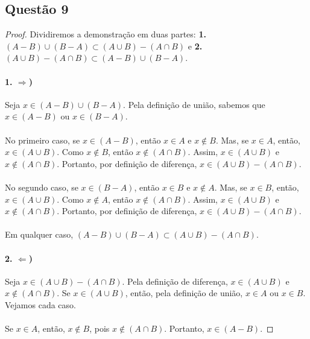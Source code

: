 \documentclass[11pt,a4paper]{report}
\begin{document}
    \subsection{Questão 9}
    \begin{proof}
    Dividiremos a demonstração em duas partes: \textbf{1.} $(A - B) \cup (B - A) \subset (A \cup B) - (A \cap B)$ e \textbf{2.} $(A \cup B) - (A \cap B) \subset (A - B) \cup (B - A)$.

    \paragraph{1. $\Rightarrow$)}
    Seja $x \in (A - B) \cup (B - A)$. Pela definição de união, sabemos que $x \in (A - B)$ ou $x \in (B - A)$. 
    
    \paragraph{}
    No primeiro caso, se $x \in (A - B)$, então $x \in A$ e $x \not\in B$. Mas, se $x \in A$, então, $x \in (A \cup B)$. Como $x \not\in B$, então $x \not\in (A \cap B)$. Assim, $x \in (A \cup B)$ e $x \not\in (A \cap B)$. Portanto, por definição de diferença, $x \in (A \cup B) - (A \cap B)$.

    \paragraph{}
    No segundo caso, se $x \in (B - A)$, então $x \in B$ e $x \not\in A$. Mas, se $x \in B$, então, $x \in (A \cup B)$. Como $x \not\in A$, então $x \not\in (A \cap B)$. Assim, $x \in (A \cup B)$ e $x \not\in (A \cap B)$. Portanto, por definição de diferença, $x \in (A \cup B) - (A \cap B)$.

    \paragraph{}
    Em qualquer caso, $(A - B) \cup (B - A) \subset (A \cup B) - (A \cap B)$.

    \paragraph{2. $\Leftarrow$)}
    Seja $x \in (A \cup B) - (A \cap B)$. Pela definição de diferença, $x \in (A \cup B)$ e $x \not\in (A \cap B)$. Se $x \in (A \cup B)$, então, pela definição de união, $x \in A $ ou $x \in B$. Vejamos cada caso.

    \paragraph{}
    Se $x \in A$, então, $x \not\in B$, pois $x \not\in (A \cap B)$. Portanto, $x \in (A - B)$. 
    

\end{proof}
\end{document}
